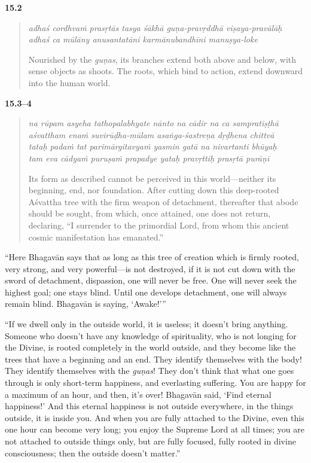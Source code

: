 \par\noindent\textbf{15.2}\par
\begin{verse}
\textit{adhaś cordhvaṁ prasṛtās tasya śākhā guṇa-pravṛddhā viṣaya-pravālāḥ} \\
\textit{adhaś ca mūlāny anusantatāni karmānubandhīni manuṣya-loke}

\noindent Nourished by the \textit{guṇas}, its branches extend both above and below, with sense objects as shoots. The roots, which bind to action, extend downward into the human world.
\end{verse}
\par



\par\noindent\textbf{15.3–4}\par
\begin{verse}
\textit{na rūpam asyeha tathopalabhyate nānto na cādir na ca sampratiṣṭhā} \\
\textit{aśvattham enaṁ suvirūḍha-mūlam asaṅga-śastreṇa dṛḍhena chittvā} \\
\textit{tataḥ padaṁ tat parimārgitavyaṁ yasmin gatā na nivartanti bhūyaḥ} \\
\textit{tam eva cādyaṁ puruṣaṁ prapadye yataḥ pravṛttiḥ prasṛtā purāṇī}

\noindent Its form as described cannot be perceived in this world---neither its beginning, end, nor foundation. After cutting down this deep-rooted Aśvattha tree with the firm weapon of detachment, thereafter that abode should be sought, from which, once attained, one does not return, declaring, \enquote{I surrender to the primordial Lord, from whom this ancient cosmic manifestation has emanated.}
\end{verse}
\par


\enquote{Here Bhagavān says that as long as this tree of creation which is firmly rooted, very strong, and very powerful---is not destroyed, if it is not cut down with the sword of detachment, dispassion, one will never be free. One will never seek the highest goal; one stays blind. Until one develops detachment, one will always remain blind. Bhagavān is saying, \enquote{Awake!}}

\enquote{If we dwell only in the outside world, it is useless; it doesn’t bring anything. Someone who doesn’t have any knowledge of spirituality, who is not longing for the Divine, is rooted completely in the world outside, and they become like the trees that have a beginning and an end. They identify themselves with the body! They identify themselves with the \textit{guṇas}! They don’t think that what one goes through is only short-term happiness, and everlasting suffering. You are happy for a maximum of an hour, and then, it’s over! Bhagavān said, \enquote{Find eternal happiness!} And this eternal happiness is not outside everywhere, in the things outside, it is inside you. And when you are fully attached to the Divine, even this one hour can become very long; you enjoy the Supreme Lord at all times; you are not attached to outside things only, but are fully focused, fully rooted in divine consciousness; then the outside doesn’t matter.}

